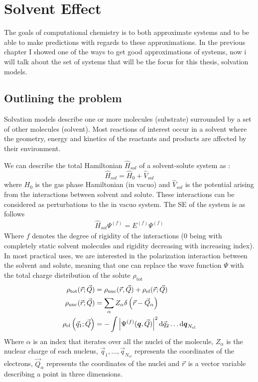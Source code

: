 \documentclass[../master_thesis.tex]{subfiles}
\begin{document}
\chapter{Solvent Effect}\label{Solvent_effect}
The goals of computational chemistry is to both approximate systems and to be
able to make predictions with regards to these approximations. In the previous
chapter I showed one of the ways to get good approximations of systems, now i
will talk about the set of systems that will be the focus for this thesis,
solvation models.
\section{Outlining the problem}
Solvation models describe one or more molecules (substrate) surrounded by
a set of other molecules (solvent). Most reactions of interest occur in a
solvent where the geometry, energy and kinetics of the reactants and products
are affected by their environment\cite{Mennucci:2018}.

We can describe the total Hamiltonian $\hat{H}_{sol}$ of a solvent-solute system as
\cite{Tomasi:1994wt}:
\begin{equation}\label{eq:Hsolvent}
  \hat{H}_{sol} = \hat{H}_0 + \hat{V}_{sol}
\end{equation}
where $H_0$ is the gas phase Hamiltonian (in vacuo) and $\hat{V}_{sol}$ is the
potential arising from the interactions between solvent and solute. These
interactions can be considered as perturbations to the in vacuo system.
The \ac{SE} of the system is as follows \cite{Tomasi:1994wt}
\begin{align}\label{eq:solSE}
  \hat{H}_{sol}\Psi^{(f)} = E^{(f)}\Psi^{(f)}
\end{align}
Where $f$ denotes the degree of  rigidity of the interactions (0 being with
completely static solvent molecules and rigidity decreasing with increasing
index). In most practical uses, we are interested in the polarization interaction
between the solvent and solute, meaning that one can replace the wave function $\Psi$ with the
total charge distribution of the solute $\rho_{\mathrm{tot}}$
\cite{Tomasi:1994wt}
\begin{align}
  \begin{split}\mathbb{}
      \rho_{\mathrm{tot}}(\vec{r} ; \vec{Q}) &=
      \rho_{\mathrm{nuc}}(\vec{r}, \vec{Q})
      + \rho_{\mathrm{el}}(\vec{r} ; \vec{Q}) \\
      \rho_{\mathrm{nuc}}(\vec{r} ; \vec{Q}) &=
      \sum_{\alpha} Z_{\alpha} \delta\left(\vec{r}
      - \vec{Q}_{\alpha}\right) \\
      \rho_{\mathrm{el}}\left(\vec{q}_{1} ; \vec{Q}\right) &=
      -\int\left|\Psi^{(f)}(\boldsymbol{q}, \vec{Q})\right|^{2}
      \mathrm{d}\vec{q}_{2} \ldots \mathrm{d}\boldsymbol{q}_{N_{\mathrm{el}}}
  \end{split}
\end{align}
Where $\alpha$ is an index that iterates over all the nuclei of the molecule,
$Z_{\alpha}$ is the nuclear charge of each nucleus, $\vec{q}_1, ..., \vec{q}_{N_{el}}$
represents the coordinates of the electrons, $\vec{Q}_{\alpha}$ represents the
coordinates of the nuclei and $\vec{r}$ is a vector variable describing a point
in three dimensions.
\end{document}
